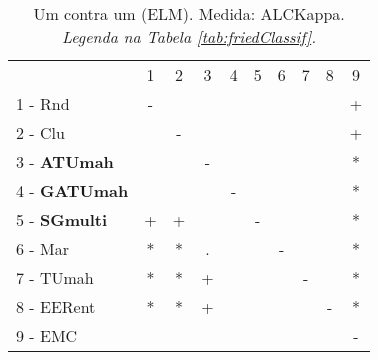\begin{table}[h]
\caption{Um contra um (ELM). Medida: ALCKappa. \textit{Legenda na Tabela \ref{tab:friedClassif}.}}
\begin{center}\begin{tabular}{lcc|cc|cc|cc|c}
 			& 1 & 2 & 3 & 4 & 5 & 6 & 7 & 8 & 9\\
1 - Rnd  	& - &   &   &   &   &   &   &   & + \\
2 - Clu  	&   & - &   &   &   &   &   &   & + \\ \hline
3 - \textbf{ATUmah}	&   &   & - &   &   &   &   &   & * \\
4 - \textbf{GATUmah}	&   &   &   & - &   &   &   &   & * \\ \hline
5 - \textbf{SGmulti}	& + & + &   &   & - &   &   &   & * \\
6 - Mar  	& * & * & . &   &   & - &   &   & * \\ \hline
7 - TUmah	& * & * & + &   &   &   & - &   & * \\
8 - EERent	& * & * & + &   &   &   &   & - & * \\ \hline
9 - EMC  	&   &   &   &   &   &   &   &   & - \\\end{tabular}
\label{stratsALCKappaFriedELMRedux}
\end{center}
\end{table}
